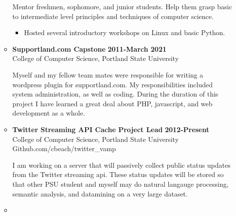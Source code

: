 \documentclass[overlapped]{res}
\begin{document}
\begin{resume}
\begin{itemize}[leftmargin=0in]
\begin{itemize}[leftmargin=0in]
\begin{samepage}
                    Mentor freshmen, sophomore, and junior students. Help them grasp basic to intermediate level
                    principles and techniques of computer science.	
                    \begin{itemize}
                        \item[\textbullet] Hosted several introductory workshops on Linux and basic Python.
                    \end{itemize}
                \end{samepage}

            \item[] 
                \begin{samepage}
                    \textbf{Supportland.com Capstone} \hfill \textbf{2011-March 2021} \\
                    College of Computer Science, Portland State University \hfill

                    Myself and my fellow team mates were responsible for writing a wordpress plugin 
                    for supportland.com. My responsibilities included system administration, as 
                    well as coding. During the duration of this project I have learned a great
                    deal about PHP, javascript, and web development as a whole.
                \end{samepage}

            \item[] 
                \begin{samepage}

                    \textbf{Twitter Streaming API Cache Project Lead} \hfill \textbf{2012-Present} \\
                    College of Computer Science, Portland State University \\
                    Github.com/cbeach/twitter\_vamp 

                    I am working on a server that will passively collect public status updates from the
                    Twitter streaming api. These status updates will be stored so that other PSU student
                    and myself may do natural langauge processing, semantic analysis, and datamining on
                    a very large dataset.				
                \end{samepage}

            \item[] 
                \begin{samepage}


\end{samepage}
\end{itemize}
\end{itemize}
\end{resume}
\end{document}
